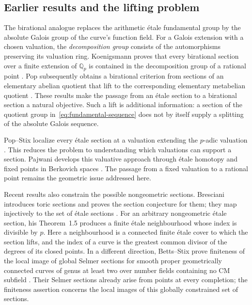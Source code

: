 \subsection{Earlier results and the lifting problem}

The birational analogue replaces the arithmetic \'etale fundamental
group by the absolute Galois group of the curve's function field.
For a Galois extension with a chosen valuation, the
\emph{decomposition group} consists of the automorphisms preserving
its valuation ring.
Koenigsmann proves that every birational section over a finite extension
of $\mathbb Q_p$ is contained in the decomposition group of a rational
point \cite[preprint version, Proposition~2.4(2)]{Koenigsmann}.
Pop subsequently obtains a birational criterion from sections of an
elementary abelian quotient that lift to the corresponding elementary
metabelian quotient
\cite[Theorems~A and~A$'$]{PopBirational}.
These results make the passage from an \'etale section to a birational
section a natural objective. Such a lift is additional information:
a section of the quotient group in~\eqref{eq:fundamental-sequence} does
not by itself supply a splitting of the absolute Galois sequence.

Pop--Stix localize every \'etale section at a valuation extending the
$p$-adic valuation \cite[preprint version, Theorem~26]{PopStix}.
This reduces the problem to understanding which valuations can support
a section. Pajwani develops this valuative approach through \'etale
homotopy and fixed points in Berkovich spaces
\cite[preprint version, Theorem~1.4 and Corollary~1.5]{Pajwani}.
The passage from a fixed valuation to a rational point remains the
geometric issue addressed here.

Recent results also constrain the possible nongeometric sections.
Bresciani introduces toric sections and proves the section conjecture
for them; they map
injectively to the set of \'etale sections
\cite[Definition~3.7 and Theorems~1.4 and~5.10]{BrescianiToric}.
For an arbitrary nongeometric \'etale section, his Theorem~1.5 produces
a finite \'etale neighbourhood whose index is divisible by $p$.
Here a neighbourhood is a connected finite \'etale cover to which the
section lifts, and the index of a curve is the greatest common divisor
of the degrees of its closed points.
In a different direction, Betts--Stix prove finiteness of the local
image of global Selmer sections for smooth proper geometrically
connected curves of genus at least two over number fields containing no CM subfield
\cite[preprint version, Theorem~A]{BettsStix}.
Their Selmer sections already arise from points at every completion;
the finiteness assertion concerns the local images of this globally
constrained set of sections.

